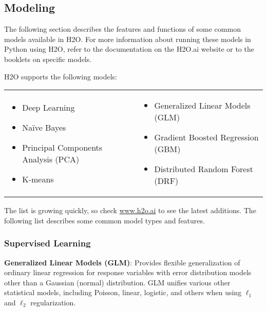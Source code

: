 \subsection{Modeling}
The following section describes the features and functions of some common models available in H2O.  For more information about running these models in Python using H2O, refer to the documentation on
the H2O.ai website or to the booklets on specific models.

\begin{minipage}{\textwidth}
H2O supports the following models:  


\begin{frame}%

\begin{tabular}{p{5.5cm}p{5.5cm}}

\begin{itemize}
  \item Deep Learning
  \item Na\"{i}ve Bayes
  \item Principal Components Analysis (PCA)
  \item K-means
\end{itemize} &

\begin{itemize}
  \item Generalized Linear Models (GLM) 
  \item Gradient Boosted Regression (GBM)
  \item Distributed Random Forest (DRF)
\end{itemize}

\end{tabular}

\end{frame}
\end{minipage}

The list is growing quickly, so check \url{www.h2o.ai} to see the latest additions. The following list describes some common model types and features. 

\subsubsection{Supervised Learning}
{\textbf{Generalized Linear Models (GLM)}}: Provides flexible generalization of ordinary linear regression for response variables with error distribution models other than a Gaussian (normal) distribution. GLM unifies various other statistical models, including Poisson, linear, logistic, and others when using $\ell_1$ and $\ell_2$ regularization.

